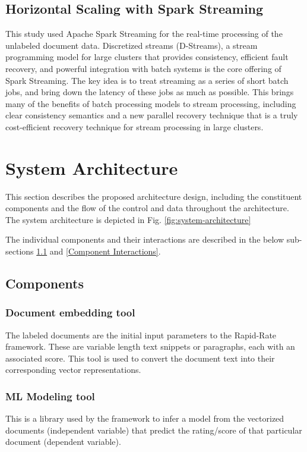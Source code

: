 \documentclass[conference]{IEEEtran}
\begin{document}
    \subsection{Horizontal Scaling with Spark Streaming}
        This study used Apache Spark Streaming for the real-time processing of the unlabeled document data. Discretized streams (D-Streams), a stream programming model for large clusters that provides consistency, efficient fault recovery, and powerful integration with batch systems is the core offering of Spark Streaming. The key idea is to treat streaming as a series of short batch jobs, and bring down the latency of these jobs as much as possible. This brings many of the benefits of batch processing models to stream processing, including clear consistency semantics and a new parallel recovery technique that is a truly cost-efficient recovery technique for stream processing in large clusters\cite{zaharia2012discretized}.

\vspace{5mm}

\section{System Architecture}
    This section describes the proposed architecture design, including the constituent components and the flow of the control and data throughout the architecture.
    The system architecture is depicted in Fig. \ref{fig:system-architecture}

    The individual components and their interactions are described in the below sub-sections \ref{Components} and \ref{Component Interactions}.

    \subsection{Components} \label{Components}

        \subsubsection{Document embedding tool}
            The labeled documents are the initial input parameters to the Rapid-Rate framework. These are variable length text snippets or paragraphs, each with an associated score. This tool is used to convert the document text into their corresponding vector representations.

        \subsubsection{ML Modeling tool}
            This is a library used by the framework to infer a model from the vectorized documents (independent variable) that predict the rating/score of that particular document (dependent variable). 
\end{document}
